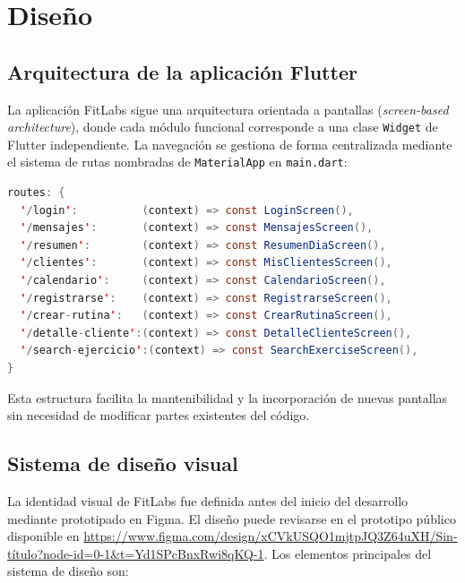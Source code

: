 \chapter{Diseño}

\section{Arquitectura de la aplicación Flutter}

La aplicación FitLabs sigue una arquitectura orientada a pantallas (\textit{screen-based architecture}), donde cada módulo funcional corresponde a una clase \texttt{Widget} de Flutter independiente. La navegación se gestiona de forma centralizada mediante el sistema de rutas nombradas de \texttt{MaterialApp} en \texttt{main.dart}:

\begin{lstlisting}[language=Java, caption={Definición de rutas en main.dart}]
routes: {
  '/login':          (context) => const LoginScreen(),
  '/mensajes':       (context) => const MensajesScreen(),
  '/resumen':        (context) => const ResumenDiaScreen(),
  '/clientes':       (context) => const MisClientesScreen(),
  '/calendario':     (context) => const CalendarioScreen(),
  '/registrarse':    (context) => const RegistrarseScreen(),
  '/crear-rutina':   (context) => const CrearRutinaScreen(),
  '/detalle-cliente':(context) => const DetalleClienteScreen(),
  '/search-ejercicio':(context) => const SearchExerciseScreen(),
}
\end{lstlisting}

Esta estructura facilita la mantenibilidad y la incorporación de nuevas pantallas sin necesidad de modificar partes existentes del código.

\section{Sistema de diseño visual}

La identidad visual de FitLabs fue definida antes del inicio del desarrollo mediante prototipado en Figma. El diseño puede revisarse en el prototipo público disponible en \url{https://www.figma.com/design/xCVkUSQO1mjtpJQ3Z64uXH/Sin-título?node-id=0-1&t=Yd1SPcBnxRwi8qKQ-1}. Los elementos principales del sistema de diseño son:

